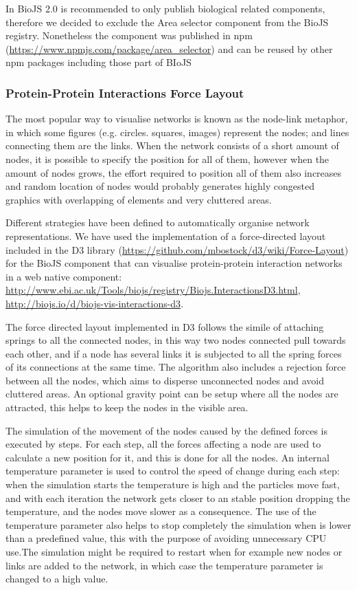 In BioJS 2.0 is recommended to only publish biological related components, therefore we decided to exclude the Area selector component from the BioJS registry. Nonetheless the component was published in npm (\url{https://www.npmjs.com/package/area_selector}) and can be reused by other npm packages including those part of BIoJS
 
\subsubsection{Protein-Protein Interactions Force Layout} \label{subsubsec:ppi_biojs}
The most popular way to visualise networks is known as the node-link metaphor, in which some figures (e.g. circles. squares, images) represent the nodes; and lines connecting them are the links. When the network consists of a short amount of nodes, it is possible to specify the position for all of them, however when the amount of nodes grows, the effort required to position all of them also increases and random location of nodes would probably generates highly congested graphics with overlapping of elements and very cluttered areas.

Different strategies have been defined to automatically organise network representations. We have used the implementation of a force-directed layout included in the D3 library (\url{https://github.com/mbostock/d3/wiki/Force-Layout}) \cite{BOS2011} for the BioJS component that can visualise protein-protein interaction networks in a web native component:  \url{http://www.ebi.ac.uk/Tools/biojs/registry/Biojs.InteractionsD3.html}, \url{http://biojs.io/d/biojs-vis-interactions-d3}.

The force directed layout implemented in D3 follows the simile of attaching springs to all the connected nodes, in this way  two nodes connected pull towards each other, and if a node has several links it is subjected to all the spring forces of its connections at the same time. The algorithm also includes a rejection force between all the nodes, which aims to disperse unconnected nodes and avoid cluttered areas. An optional gravity point can be setup where all the nodes are attracted, this helps to keep the nodes in the visible area. 

The simulation of the movement of the nodes caused by the defined forces is executed by steps. For each step, all the forces affecting a node are used to calculate a new position for it, and this is done for all the nodes. An internal temperature parameter is used to control the speed of change during each step: when the simulation starts the temperature is high and the particles move fast, and with each iteration the network gets closer to an stable position dropping the temperature, and the nodes move slower as a consequence. The use of the temperature parameter also helps to stop completely the simulation when is lower than a predefined value, this with the purpose of avoiding unnecessary CPU use.The simulation might be required to restart when for example new nodes or links are added to the network, in which case the temperature parameter is changed to a high value.

